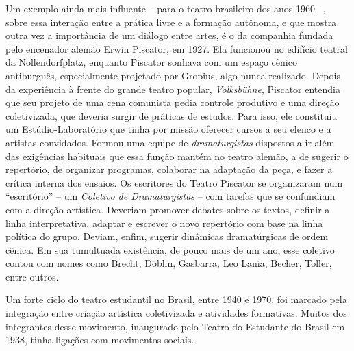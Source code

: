 Um exemplo ainda mais influente -- para o teatro brasileiro dos anos 1960
--, sobre essa interação entre a prática livre e a formação autônoma, e
que mostra outra vez a importância de um diálogo entre artes, é o da
companhia fundada pelo encenador alemão Erwin Piscator, em 1927. Ela
funcionou no edifício teatral da Nollendorfplatz, enquanto Piscator
sonhava com um espaço cênico antiburguês, especialmente projetado por
Gropius, algo nunca realizado. Depois da experiência à frente do grande
teatro popular, {\it Volksbühne}, Piscator entendia que seu projeto de
uma cena comunista pedia controle produtivo e uma direção coletivizada,
que deveria surgir de práticas de estudos. Para isso, ele constituiu um
Estúdio-Laboratório que tinha por missão oferecer cursos a seu elenco e
a artistas convidados. Formou uma equipe de {\it dramaturgistas}
dispostos a ir além das exigências habituais que essa função mantém no
teatro alemão, a de sugerir o repertório, de organizar programas,
colaborar na adaptação da peça, e fazer a crítica interna dos ensaios.
Os escritores do Teatro Piscator se organizaram num “escritório” -- um
{\it Coletivo de Dramaturgistas} -- com tarefas que se confundiam com a
direção artística. Deveriam promover debates sobre os textos, definir a
linha interpretativa, adaptar e escrever o novo repertório com base na
linha política do grupo. Deviam, enfim, sugerir dinâmicas dramatúrgicas
de ordem cênica. Em sua tumultuada existência, de pouco mais de um ano,
esse coletivo contou com nomes como Brecht, Döblin, Gasbarra, Leo Lania,
Becher, Toller, entre outros.

Um forte ciclo do teatro estudantil no Brasil, entre 1940 e 1970, foi
marcado pela integração entre criação artística coletivizada e
atividades formativas. Muitos dos integrantes desse movimento,
inaugurado pelo Teatro do Estudante do Brasil em 1938, tinha ligações
com movimentos sociais.


